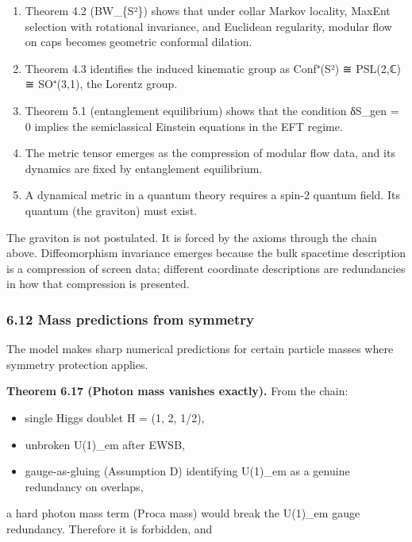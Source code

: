 \begin{enumerate}
\def\labelenumi{\arabic{enumi}.}
\tightlist
\item
  Theorem 4.2 (BW\_\{S²\}) shows that under collar Markov locality, MaxEnt selection with rotational invariance, and Euclidean regularity, modular flow on caps becomes geometric conformal dilation.
\item
  Theorem 4.3 identifies the induced kinematic group as Conf⁺(S²) ≅ PSL(2,ℂ) ≅ SO⁺(3,1), the Lorentz group.
\item
  Theorem 5.1 (entanglement equilibrium) shows that the condition δS\_gen = 0 implies the semiclassical Einstein equations in the EFT regime.
\item
  The metric tensor emerges as the compression of modular flow data, and its dynamics are fixed by entanglement equilibrium.
\item
  A dynamical metric in a quantum theory requires a spin-2 quantum field. Its quantum (the graviton) must exist.
\end{enumerate}

The graviton is not postulated. It is forced by the axioms through the chain above. Diffeomorphism invariance emerges because the bulk spacetime description is a compression of screen data; different coordinate descriptions are redundancies in how that compression is presented.

\subsubsection{6.12 Mass predictions from symmetry}\label{612-mass-predictions-from-symmetry}

The model makes sharp numerical predictions for certain particle masses where symmetry protection applies.

\textbf{Theorem 6.17 (Photon mass vanishes exactly).} From the chain:

\begin{itemize}
\tightlist
\item
  single Higgs doublet H = (1, 2, 1/2),
\item
  unbroken U(1)\_em after EWSB,
\item
  gauge-as-gluing (Assumption D) identifying U(1)\_em as a genuine redundancy on overlaps,
\end{itemize}

a hard photon mass term (Proca mass) would break the U(1)\_em gauge redundancy. Therefore it is forbidden, and

